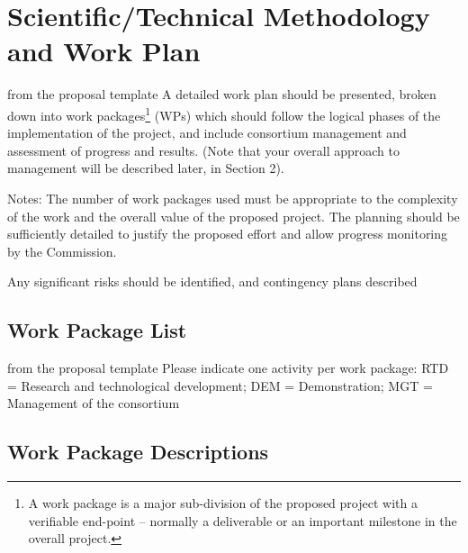 \section{Scientific/Technical Methodology and Work Plan}\label{sec:methodology}
\begin{todo}{from the proposal template}
  A detailed work plan should be presented, broken down into work packages\footnote{A work
    package is a major sub-division of the proposed project with a verifiable end-point –
    normally a deliverable or an important milestone in the overall project.} (WPs) which
  should follow the logical phases of the implementation of the project, and include
  consortium management and assessment of progress and results. (Note that your overall
  approach to management will be described later, in Section 2).

Notes: The number of work packages used must be appropriate to the complexity of the work
and the overall value of the proposed project. The planning should be sufficiently
detailed to justify the proposed effort and allow progress monitoring by the Commission.

Any significant risks should be identified, and contingency plans described
\end{todo}
\newpage

\newpage
\subsection{Work Package List}\label{sec:wplist}

\begin{todo}{from the proposal template}
Please indicate one activity per work package:
RTD = Research and technological development; DEM = Demonstration; MGT = Management of the consortium
\end{todo}

\wpfigstyle{\footnotesize}

\newpage
\newpage

\subsection{Work Package Descriptions}\label{sec:workpackages}
\begin{workplan}
  
  
  
  
  
  
  
  
  
\end{workplan}
\newpage



